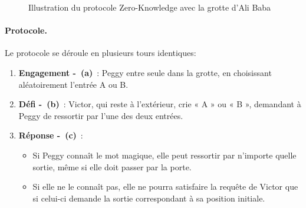 \documentclass[12pt]{report}
\begin{document}
\begin{figure}[h]
    \centering
    \hfill
    \hfill
    \caption{Illustration du protocole Zero-Knowledge avec la grotte d'Ali Baba}
\end{figure}



\paragraph{Protocole.} Le protocole se déroule en plusieurs tours identiques:
\begin{enumerate}
    \item \textbf{Engagement \--\ (a)} : Peggy entre seule dans la grotte, en choisissant aléatoirement l'entrée A ou B.
    \item \textbf{Défi \--\ (b)} : Victor, qui reste à l'extérieur, crie « A » ou « B », demandant à Peggy de ressortir par l'une des deux entrées.
    \item \textbf{Réponse \--\ (c)} : 
    \begin{itemize}
        \item Si Peggy connaît le mot magique, elle peut ressortir par n'importe quelle sortie, même si elle doit passer par la porte.
        \item Si elle ne le connaît pas, elle ne pourra satisfaire la requête de Victor que si celui-ci demande la sortie correspondant à sa position initiale.
    \end{itemize}
\end{enumerate}
\end{document}
